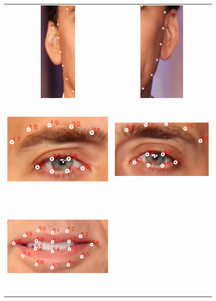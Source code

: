 \begin{figure}
\centering
\begin{tabular}{cc}
\includegraphics[width=0.4\linewidth, height=5cm]{figs/nick-marked-l-ear.png} &
\includegraphics[width=0.4\linewidth, height=5cm]{figs/nick-marked-r-ear.png} \\
\includegraphics[width=0.4\linewidth, height=5cm]{figs/nick-marked-l-eye.png} &
\includegraphics[width=0.4\linewidth, height=5cm]{figs/nick-marked-r-eye.png} \\
\includegraphics[width=0.4\linewidth, height=5cm]{figs/nick-marked-mouth.png} &

\end{tabular}
\end{figure}
